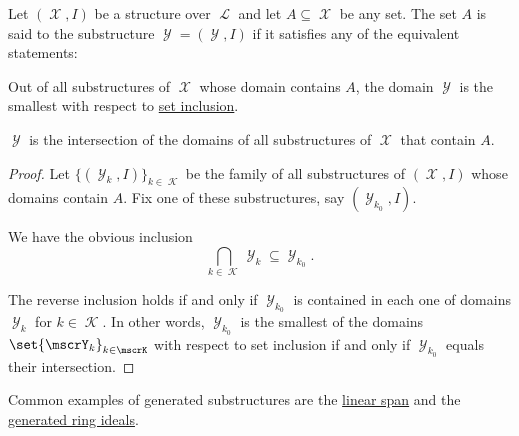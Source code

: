 \begin{definition}\label{def:first_order_generated_substructure}
  Let \( (\mscrX, I) \) be a structure over \( \mscrL \) and let \( A \subseteq \mscrX \) be any set. The set \( A \) is said to  the substructure \( \mscrY = (\mscrY, I) \) if it satisfies any of the equivalent statements:
  \begin{thmenum}
     Out of all substructures of \( \mscrX \) whose domain contains \( A \), the domain \( \mscrY \) is the smallest with respect to \hyperref[def:subset]{set inclusion}.

     \( \mscrY \) is the intersection of the domains of all substructures of \( \mscrX \) that contain \( A \).
  \end{thmenum}
\end{definition}
\begin{proof}
  Let \( \{ (\mscrY_k, I) \}_{k \in \mscrK} \) be the family of all substructures of \( (\mscrX, I) \) whose domains contain \( A \). Fix one of these substructures, say \( (\mscrY_{k_0}, I) \).

  We have the obvious inclusion
  \begin{equation*}
    \bigcap_{k \in \mscrK} \mscrY_k \subseteq \mscrY_{k_0}.
  \end{equation*}

  The reverse inclusion holds if and only if \( \mscrY_{k_0} \) is contained in each one of domains \( \mscrY_k \) for \( k \in \mscrK \). In other words, \( \mscrY_{k_0} \) is the smallest of the domains \( \set{ \mscrY_k }_{k \in \mscrK} \) with respect to set inclusion if and only if \( \mscrY_{k_0} \) equals their intersection.
\end{proof}

\begin{example}\label{ex:def:first_order_generated_substructure}
  Common examples of generated substructures are the \hyperref[def:linear_span]{linear span} and the \hyperref[def:generated_ring_ideal]{generated ring ideals}.
\end{example}

